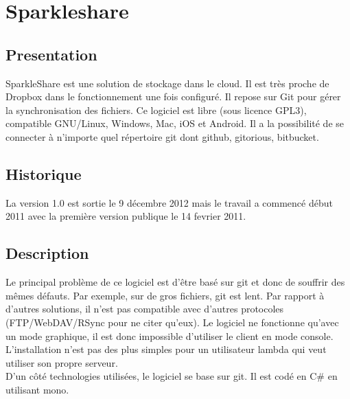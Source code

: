 \chapter{Sparkleshare}
\thispagestyle{EIP} %
\section{Presentation}
SparkleShare est une solution de stockage dans le cloud. Il est très proche de Dropbox dans le fonctionnement une fois configuré. Il repose sur Git pour gérer la synchronisation des fichiers. Ce logiciel est libre (sous licence GPL3), compatible GNU/Linux, Windows, Mac, iOS et Android. Il a la possibilité de se connecter à n'importe quel répertoire git dont github, gitorious, bitbucket.\\

\section{Historique}
La version 1.0 est sortie le 9 décembre 2012 mais le travail a commencé début 2011 avec la première version publique le 14 fevrier 2011.\\

\section{Description}
Le principal problème de ce logiciel est d'être basé sur git et donc de souffrir des mêmes défauts. Par exemple, sur de gros fichiers, git est lent. Par rapport à d'autres solutions, il n'est pas compatible avec d'autres protocoles (FTP/WebDAV/RSync pour ne citer qu'eux). Le logiciel ne fonctionne qu'avec un mode graphique, il est donc impossible d'utiliser le client en mode console. L'installation n'est pas des plus simples pour un utilisateur lambda qui veut utiliser son propre serveur.\\

D'un côté technologies utilisées, le logiciel se base sur git. Il est codé en C\# en utilisant mono.\\
